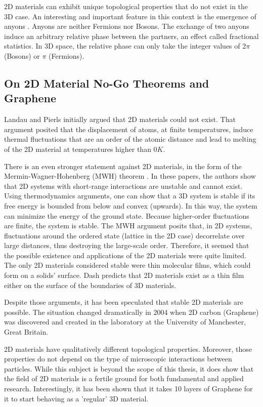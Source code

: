 2D materials can exhibit unique topological properties that do not exist in the 3D case. An interesting and important feature in this context is the emergence of anyons \cite{anyonsR}. Anyons are neither Fermions nor Bosons. The exchange of two anyons induce  an 
arbitrary relative phase between the partners, an effect called fractional statistics.
In 3D space, the relative phase can only take the integer values of $2 \pi $ (Bosons)
or $ \pi$ (Fermions).
 
\subsection{On 2D Material No-Go Theorems and
Graphene}
Landau and Pierls\cite{LandauG}\cite{Pierls} initially argued that 2D materials could not exist. That argument posited that the displacement of atoms, at finite temperatures, induce thermal fluctuations that are an order of the atomic distance\cite{LandauG, Pierls} and lead to melting of the 2D material at temperatures higher than $ 0 K $. 

There is an even stronger statement against 2D materials, in the form of the Mermin-Wagner-Hohenberg (MWH) theorem \cite{Hohenberg}\cite{Mermin2}. In these papers, the authors show that 2D systems with short-range interactions are unstable and cannot exist.  Using thermodynamics arguments, one can show that a 3D system is stable if its free energy is bounded from below and convex (upwards). In this way, the system can minimize the energy of the ground state. Because higher-order fluctuations are finite, the system is stable.
The MWH argument posits that, in 2D systems, fluctuations around the ordered state (lattice in the 2D case) decorrelate over large distances, thus destroying the large-scale order. 
Therefore, it seemed that the possible existence and applications of the 2D materials were quite limited. The only 2D materials considered stable were thin molecular films, which could form on a solids' surface. Dash\cite{2DMatter1} predicts that 2D materials exist as a thin film either on the surface of the boundaries of 3D materials.

Despite those arguments, it has been speculated that stable 2D materials are possible\cite{2DMatter1}. The situation changed dramatically in 2004 when 2D carbon (Graphene) was discovered and created in the laboratory\cite{Graphene0, GrapheneN} at the University of Manchester, Great Britain. 

2D materials have qualitatively different topological properties\cite{2DMatterCurvature}. Moreover, those properties do not depend on the type of microscopic interactions between particles. While this subject is beyond the scope of this thesis, it does show that the field of 2D materials is a fertile ground for both fundamental and applied research. Interestingly, it has been shown \cite{GraphLayers} that it takes 10 layers of Graphene for it to start behaving as a 'regular' 3D material. 

